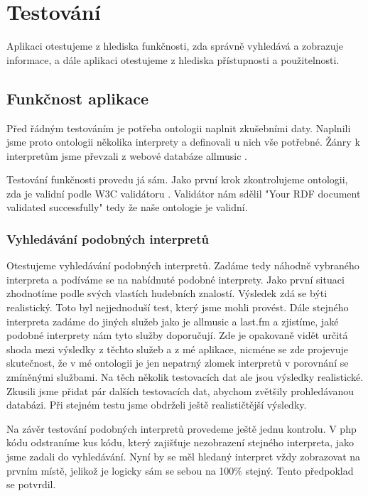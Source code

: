 \chapter{Testování}

Aplikaci otestujeme z hlediska funkčnosti, zda správně vyhledává a zobrazuje informace, a dále aplikaci otestujeme z hlediska přístupnosti a použitelnosti.

\section{Funkčnost aplikace}

Před řádným testováním je potřeba ontologii naplnit zkušebními daty. Naplnili jsme proto ontologii několika interprety a definovali u nich vše potřebné. Žánry k interpretům jsme převzali z webové databáze allmusic \cite{allmusic}.

Testování funkčnosti provedu já sám. Jako první krok zkontrolujeme ontologii, zda je validní podle W3C validátoru \cite{validator}.
Validátor nám sdělil "Your RDF document validated successfully" tedy že naše ontologie je validní.

\subsection{Vyhledávání podobných interpretů} 

Otestujeme vyhledávání podobných interpretů. Zadáme tedy náhodně vybraného interpreta a podíváme se na nabídnuté podobné interprety. Jako první situaci zhodnotíme podle svých vlastích hudebních znalostí. Výsledek zdá se býti realistický. Toto byl nejjednoduší test, který jsme mohli provést.
Dále stejného interpreta zadáme do jiných služeb jako je allmusic \cite{allmusic} a last.fm \cite{lastfm} a zjistíme, jaké podobné interprety nám tyto služby doporučují.
Zde je opakovaně vidět určitá shoda mezi výsledky z těchto služeb a z mé aplikace, nicméne se zde projevuje skutečnost, že v mé ontologii je jen nepatrný zlomek interpretů v porovnání se zmíněnými službami. Na těch několik testovacích dat ale jsou výsledky realistické.
Zkusili jsme přidat pár dalších testovacích dat, abychom zvětšily prohledávanou databázi. Při stejném testu jsme obdrželi ještě realističtější výsledky.

Na závěr testování podobných interpretů provedeme ještě jednu kontrolu. V php kódu odstraníme kus kódu, který zajišťuje nezobrazení stejného interpreta, jako jsme zadali do vyhledávání.
Nyní by se měl hledaný interpret vždy zobrazovat na prvním místě, jelikož je logicky sám se sebou na 100\% stejný. Tento předpoklad se potvrdil. 

